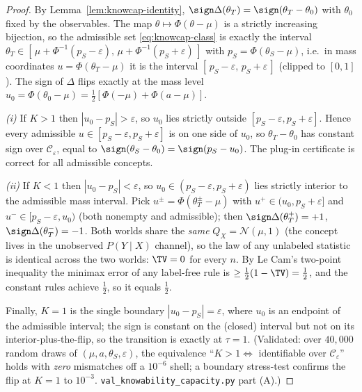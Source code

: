 \begin{proof}
By Lemma~\ref{lem:knowcap-identity}, $\sign\Delta(\theta_T)=\sign(\theta_T-\theta_0)$
with $\theta_0$ fixed by the observables. The map $\theta\mapsto\Phi(\theta-\mu)$ is
a strictly increasing bijection, so the admissible set \eqref{eq:knowcap-class} is
exactly the interval
$\theta_T\in[\,\mu+\Phi^{-1}(p_S-\varepsilon),\,\mu+\Phi^{-1}(p_S+\varepsilon)\,]$ with
$p_S=\Phi(\theta_S-\mu)$, i.e.\ in mass coordinates $u=\Phi(\theta_T-\mu)$ it is the
interval $[\,p_S-\varepsilon,\,p_S+\varepsilon\,]$ (clipped to $[0,1]$). The sign of
$\Delta$ flips exactly at the mass level $u_0=\Phi(\theta_0-\mu)=\tfrac12[\Phi(-\mu)+\Phi(a-\mu)]$.

\emph{(i)} If $K>1$ then $|u_0-p_S|>\varepsilon$, so $u_0$ lies strictly outside
$[p_S-\varepsilon,p_S+\varepsilon]$. Hence every admissible $u\in[p_S-\varepsilon,p_S+\varepsilon]$
is on one side of $u_0$, so $\theta_T-\theta_0$ has constant sign over
$\mathcal C_\varepsilon$, equal to $\sign(\theta_S-\theta_0)=\sign(p_S-u_0)$. The
plug-in certificate is correct for all admissible concepts.

\emph{(ii)} If $K<1$ then $|u_0-p_S|<\varepsilon$, so $u_0\in(p_S-\varepsilon,p_S+\varepsilon)$
lies strictly interior to the admissible mass interval. Pick
$u^\pm=\Phi(\theta_T^\pm-\mu)$ with $u^+\in(u_0,p_S+\varepsilon]$ and
$u^-\in[p_S-\varepsilon,u_0)$ (both nonempty and admissible); then
$\sign\Delta(\theta_T^+)=+1$, $\sign\Delta(\theta_T^-)=-1$. Both worlds share the
\emph{same} $Q_X=\mathcal N(\mu,1)$ (the concept lives in the unobserved
$P(Y\mid X)$ channel), so the law of any unlabeled statistic is identical across
the two worlds: $\TV=0$ for every $n$. By Le Cam's two-point inequality the minimax
error of any label-free rule is $\ge\tfrac12(1-\TV)=\tfrac12$, and the constant
rules achieve $\tfrac12$, so it equals $\tfrac12$.

Finally, $K=1$ is the single boundary $|u_0-p_S|=\varepsilon$, where $u_0$ is an
endpoint of the admissible interval; the sign is constant on the (closed) interval
but not on its interior-plus-the-flip, so the transition is exactly at $\tau=1$.
(Validated: over $40{,}000$ random draws of $(\mu,a,\theta_S,\varepsilon)$, the
equivalence ``$K>1\iff$ identifiable over $\mathcal C_\varepsilon$'' holds with
\emph{zero} mismatches off a $10^{-6}$ shell; a boundary stress-test confirms the
flip at $K=1$ to $10^{-3}$. \texttt{val\_knowability\_capacity.py} part (A).)
\end{proof}

